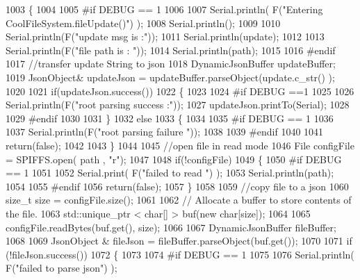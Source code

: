 \begin{DoxyCode}
1003 \{
1004 
1005 \textcolor{preprocessor}{#if DEBUG == 1}
1006 
1007     Serial.println( F(\textcolor{stringliteral}{"Entering CoolFileSystem.fileUpdate()"}) );
1008     Serial.println();
1009     
1010     Serial.println(F(\textcolor{stringliteral}{"update msg is :"}));
1011     Serial.println(update);
1012     
1013     Serial.println(F(\textcolor{stringliteral}{"file path is : "}));
1014     Serial.println(path);   
1015 
1016 \textcolor{preprocessor}{#endif}
1017     \textcolor{comment}{//transfer update String to json}
1018     DynamicJsonBuffer updateBuffer;
1019     JsonObject& updateJson = updateBuffer.parseObject(update.c\_str() );
1020     
1021     \textcolor{keywordflow}{if}(updateJson.success())
1022     \{
1023     
1024 \textcolor{preprocessor}{    #if DEBUG ==1}
1025         
1026         Serial.println(F(\textcolor{stringliteral}{"root parsing success :"}));
1027         updateJson.printTo(Serial);
1028     
1029 \textcolor{preprocessor}{    #endif}
1030 
1031     \}
1032     \textcolor{keywordflow}{else}
1033     \{
1034     
1035 \textcolor{preprocessor}{    #if DEBUG == 1 }
1036     
1037         Serial.println(F(\textcolor{stringliteral}{"root parsing failure "}));
1038     
1039 \textcolor{preprocessor}{    #endif}
1040         
1041         \textcolor{keywordflow}{return}(\textcolor{keyword}{false});  
1042 
1043     \}
1044     
1045     \textcolor{comment}{//open file in read mode}
1046     File configFile = SPIFFS.open( path , \textcolor{stringliteral}{"r"});
1047     
1048     \textcolor{keywordflow}{if}(!configFile)
1049     \{   
1050 \textcolor{preprocessor}{    #if DEBUG == 1}
1051         
1052         Serial.print( F(\textcolor{stringliteral}{"failed to read "}) );
1053         Serial.println(path);
1054 
1055 \textcolor{preprocessor}{    #endif}
1056         \textcolor{keywordflow}{return}(\textcolor{keyword}{false});
1057     \}
1058 
1059     \textcolor{comment}{//copy file to a json}
1060     \textcolor{keywordtype}{size\_t} size = configFile.size();
1061 
1062     \textcolor{comment}{// Allocate a buffer to store contents of the file.}
1063     std::unique\_ptr < char[] > buf(\textcolor{keyword}{new} \textcolor{keywordtype}{char}[size]);
1064 
1065     configFile.readBytes(buf.get(), size);
1066 
1067     DynamicJsonBuffer fileBuffer;
1068 
1069     JsonObject & fileJson = fileBuffer.parseObject(buf.get());
1070 
1071     \textcolor{keywordflow}{if} (!fileJson.success())
1072     \{
1073 
1074 \textcolor{preprocessor}{    #if DEBUG == 1}
1075 
1076         Serial.println( F(\textcolor{stringliteral}{"failed to parse json"}) );

\end{DoxyCode}
